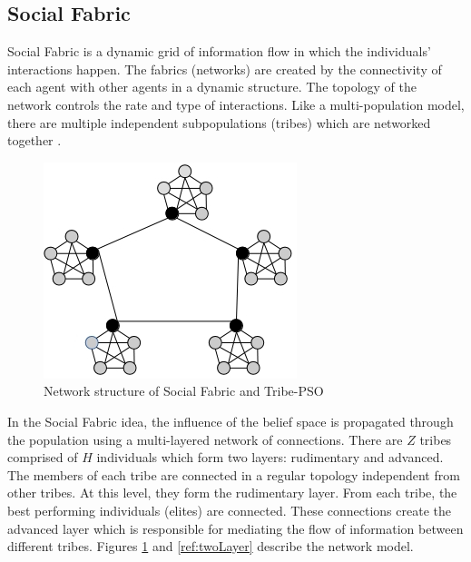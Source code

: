 \documentclass{llncs}
\begin{document}
\subsection{Social Fabric}
Social Fabric is a dynamic grid of information flow in which the individuals' interactions happen. The fabrics (networks) are created by the connectivity of each agent with other agents in a dynamic structure. The topology of the network controls the rate and type of interactions. Like a multi-population model, there are multiple independent subpopulations (tribes) which are networked together \cite{ali2011boosting}.\newline
\begin{figure}[h]
	\includegraphics[scale=0.6]{tpso}
	\centering
	\caption{Network structure of Social Fabric and Tribe-PSO}
	\label{ref:tpso}
\end{figure}
In the Social Fabric idea, the influence of the belief space is propagated through the population using a multi-layered network of connections. There are $Z$ tribes comprised of $H$ individuals which form two layers: rudimentary and advanced. The members of each tribe are connected in a regular topology independent from other tribes. At this level, they form the rudimentary layer. From each tribe, the best performing individuals (elites) are connected. These connections create the advanced layer which is responsible for mediating the flow of information between different tribes. Figures \ref{ref:tpso} and \ref{ref:twoLayer} describe the network model.
\end{document}
